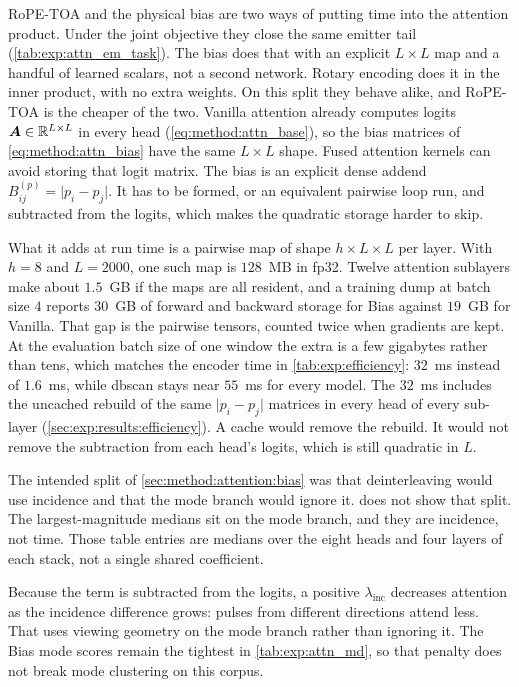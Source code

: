 RoPE-TOA and the physical bias are two ways of putting time into the attention product.
Under the joint objective they close the same emitter tail (\cref{tab:exp:attn_em_task}).
The bias does that with an explicit $L\times L$ map and a handful of learned scalars, not a second network.
Rotary encoding does it in the inner product, with no extra weights.
On this split they behave alike, and RoPE-TOA is the cheaper of the two.
Vanilla attention already computes logits $\bm{A}\in\mathbb{R}^{L\times L}$ in every head (\cref{eq:method:attn_base}), so the bias matrices of \cref{eq:method:attn_bias} have the same $L\times L$ shape.
Fused attention kernels can avoid storing that logit matrix.
The bias is an explicit dense addend $B^{(p)}_{ij}=\lvert p_i-p_j\rvert$.
It has to be formed, or an equivalent pairwise loop run, and subtracted from the logits, which makes the quadratic storage harder to skip.

What it adds at run time is a pairwise map of shape $h \times L \times L$ per layer.
With $h=8$ and $L=2000$, one such map is $128$~MB in fp32.
Twelve attention sublayers make about $1.5$~GB if the maps are all resident, and a training dump at batch size $4$ reports $30$~GB of forward and backward storage for Bias against $19$~GB for Vanilla.
That gap is the pairwise tensors, counted twice when gradients are kept.
At the evaluation batch size of one window the extra is a few gigabytes rather than tens, which matches the encoder time in \cref{tab:exp:efficiency}: $32$~ms instead of $1.6$~ms, while \gls{dbscan} stays near $55$~ms for every model.
The $32$~ms includes the uncached rebuild of the same $\lvert p_i-p_j\rvert$ matrices in every head of every sub-layer (\cref{sec:exp:results:efficiency}).
A cache would remove the rebuild.
It would not remove the subtraction from each head's logits, which is still quadratic in $L$.

The intended split of \cref{sec:method:attention:bias} was that deinterleaving would use incidence and that the mode branch would ignore it.
 does not show that split.
The largest-magnitude medians sit on the mode branch, and they are incidence, not time.
Those table entries are medians over the eight heads and four layers of each stack, not a single shared coefficient.

Because the term is subtracted from the logits, a positive $\lambda_{\mathrm{inc}}$ decreases attention as the incidence difference grows: pulses from different directions attend less.
That uses viewing geometry on the mode branch rather than ignoring it.
The Bias mode scores remain the tightest in \cref{tab:exp:attn_md}, so that penalty does not break mode clustering on this corpus.

